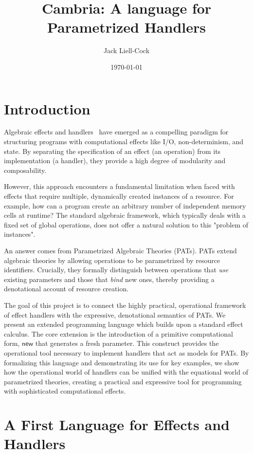 \documentclass{article}
\title{Cambria: A language for Parametrized Handlers}
\author{Jack Liell-Cock}
\date{\today}
\theoremstyle{definition}
\theoremstyle{remark}
\newcommand\new{\mathsf{new}}
\begin{document}
\maketitle

\section{Introduction}

Algebraic effects and handlers~\cite{pretnar_introduction_2015} have emerged as a compelling paradigm for structuring programs with computational effects like I/O, non-determinism, and state.
By separating the specification of an effect (an operation) from its implementation (a handler), they provide a high degree of modularity and composability.

However, this approach encounters a fundamental limitation when faced with effects that require multiple, dynamically created instances of a resource.
For example, how can a program create an arbitrary number of independent memory cells at runtime?
The standard algebraic framework, which typically deals with a fixed set of global operations, does not offer a natural solution to this "problem of instances".

An answer comes from Parametrized Algebraic Theories (PATs).
PATs extend algebraic theories by allowing operations to be parametrized by resource identifiers.
Crucially, they formally distinguish between operations that \emph{use} existing parameters and those that \emph{bind} new ones,
thereby providing a denotational account of resource creation.

The goal of this project is to connect the highly practical, operational framework of effect handlers with the expressive, denotational semantics of PATs.
We present an extended programming language which builds upon a standard effect calculus.
The core extension is the introduction of a primitive computational form, $\new$ that generates a fresh parameter.
This construct provides the operational tool necessary to implement handlers that act as models for PATs.
By formalizing this language and demonstrating its use for key examples, we show how the operational world of handlers can be unified with the equational world of parametrized theories,
creating a practical and expressive tool for programming with sophisticated computational effects.

\section{A First Language for Effects and Handlers}
\end{document}
